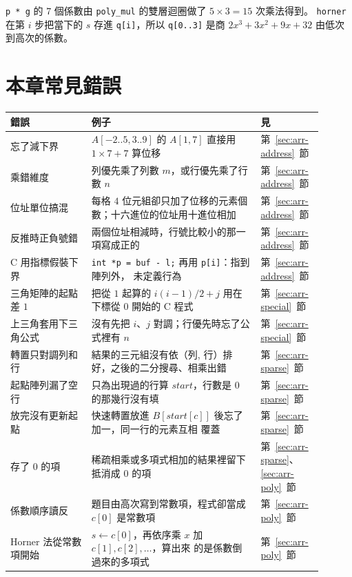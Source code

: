 \texttt{p * g} 的 $7$ 個係數由 \texttt{poly\_mul} 的雙層迴圈做了 $5 \times 3 = 15$
次乘法得到。 \texttt{horner} 在第 $i$ 步把當下的 $s$ 存進 \texttt{q[i]}，所以
\texttt{q[0..3]} 是商 $2x^3 + 3x^2 + 9x + 32$ 由低次到高次的係數。

\section{本章常見錯誤}
\label{sec:arr-pitfalls}

\begin{center}
\begin{tabular}{p{0.24\linewidth}p{0.50\linewidth}p{0.16\linewidth}}
\toprule
錯誤 & 例子 & 見 \\
\midrule
忘了減下界 & $A[-2..5, 3..9]$ 的 $A[1, 7]$ 直接用 $1 \times 7 + 7$ 算位移 &
第~\ref{sec:arr-address}~節 \\
乘錯維度 & 列優先乘了列數 $m$，或行優先乘了行數 $n$ & 第~\ref{sec:arr-address}~節 \\
位址單位搞混 & 每格 $4$ 位元組卻只加了位移的元素個數；十六進位的位址用十進位相加 &
第~\ref{sec:arr-address}~節 \\
反推時正負號錯 & 兩個位址相減時，行號比較小的那一項寫成正的 &
第~\ref{sec:arr-address}~節 \\
C 用指標假裝下界 & \texttt{int *p = buf - l;} 再用 \texttt{p[i]}：指到陣列外，
未定義行為 & 第~\ref{sec:arr-address}~節 \\
三角矩陣的起點差 $1$ & 把從 $1$ 起算的 $i(i-1)/2 + j$ 用在下標從 $0$ 開始的 C 程式 &
第~\ref{sec:arr-special}~節 \\
上三角套用下三角公式 & 沒有先把 $i$、$j$ 對調；行優先時忘了公式裡有 $n$ &
第~\ref{sec:arr-special}~節 \\
轉置只對調列和行 & 結果的三元組沒有依（列, 行）排好，之後的二分搜尋、相乘出錯 &
第~\ref{sec:arr-sparse}~節 \\
起點陣列漏了空行 & 只為出現過的行算 $\mathit{start}$，行數是 $0$ 的那幾行沒有填 &
第~\ref{sec:arr-sparse}~節 \\
放完沒有更新起點 & 快速轉置放進 $B[\mathit{start}[c]]$ 後忘了加一，同一行的元素互相
覆蓋 & 第~\ref{sec:arr-sparse}~節 \\
存了 $0$ 的項 & 稀疏相乘或多項式相加的結果裡留下抵消成 $0$ 的項 &
第~\ref{sec:arr-sparse}、\ref{sec:arr-poly}~節 \\
係數順序讀反 & 題目由高次寫到常數項，程式卻當成 $c[0]$ 是常數項 &
第~\ref{sec:arr-poly}~節 \\
Horner 法從常數項開始 & $s \gets c[0]$，再依序乘 $x$ 加 $c[1], c[2], \ldots$，算出來
的是係數倒過來的多項式 & 第~\ref{sec:arr-poly}~節 \\
\bottomrule
\end{tabular}
\end{center}


